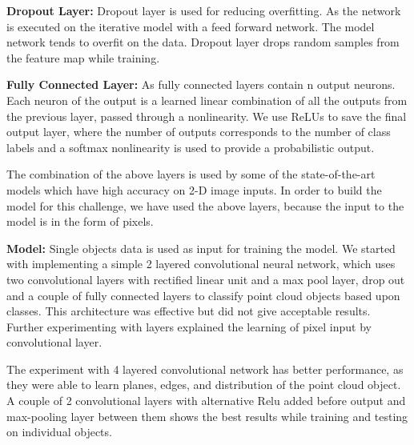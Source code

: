 \textbf{Dropout Layer:}
Dropout layer is used for reducing overfitting. As the network is executed on the iterative model with a feed forward network.
The model network tends to overfit on the data. Dropout layer drops random samples from the feature
map while training.

\textbf{Fully Connected Layer:}
As fully connected layers contain n output neurons. Each neuron of the output is a learned linear
combination of all the outputs from the previous layer, passed through a nonlinearity.
We use ReLUs to save the final output layer, where the number of outputs corresponds
to the number of class labels and a softmax nonlinearity is used to provide a probabilistic output.



The combination of the above layers is used by some of the state-of-the-art models which have high accuracy on 2-D image inputs.
In order to build the model for this challenge, we have used the above layers, because the input to the model is in the form of pixels.

\textbf{Model:}
Single objects data is used as input for training the model. We started with implementing a simple 2 layered convolutional neural network,
which uses two convolutional layers with rectified linear unit and a max pool layer,
drop out and a couple of fully connected layers to classify point cloud objects based upon classes.
This architecture was effective but 
did not give acceptable results. 
Further experimenting with layers explained the learning of pixel input by convolutional layer.

The experiment with 4 layered convolutional network has better performance, as they were able to learn planes, edges, and distribution of the point cloud object.
A couple of 2 convolutional layers with alternative Relu added before output and max-pooling layer between them shows the best results while training and testing on individual objects.

